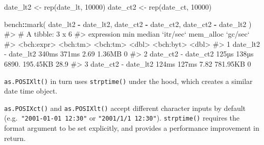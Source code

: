 \documentclass[
]{krantz}
\makeatletter
\newenvironment{Shaded}{\begin{snugshade}}{\end{snugshade}}
\newcommand{\CommentTok}[1]{\textcolor[rgb]{0.56,0.35,0.01}{\textit{#1}}}
\newcommand{\DataTypeTok}[1]{\textcolor[rgb]{0.13,0.29,0.53}{#1}}
\newcommand{\DecValTok}[1]{\textcolor[rgb]{0.00,0.00,0.81}{#1}}
\newcommand{\KeywordTok}[1]{\textcolor[rgb]{0.13,0.29,0.53}{\textbf{#1}}}
\newcommand{\NormalTok}[1]{#1}
\newcommand{\OperatorTok}[1]{\textcolor[rgb]{0.81,0.36,0.00}{\textbf{#1}}}
\newcommand{\StringTok}[1]{\textcolor[rgb]{0.31,0.60,0.02}{#1}}
\newenvironment{kframe}{%
\medskip{}
\setlength{\fboxsep}{.8em}
 \def\at@end@of@kframe{}%
 \ifinner\ifhmode%
  \def\at@end@of@kframe{\end{minipage}}%
  \begin{minipage}{\columnwidth}%
 \fi\fi%
 \def\FrameCommand##1{\hskip\@totalleftmargin \hskip-\fboxsep
 \colorbox{shadecolor}{##1}\hskip-\fboxsep
     \hskip-\linewidth \hskip-\@totalleftmargin \hskip\columnwidth}%
 \MakeFramed {\advance\hsize-\width
   \@totalleftmargin\z@ \linewidth\hsize
   \@setminipage}}%
 {\par\unskip\endMakeFramed%
 \at@end@of@kframe}
\renewenvironment{Shaded}{\begin{kframe}}{\end{kframe}}
\renewcommand{\KeywordTok} [1]{\textcolor[rgb]{0.00,0.44,0.13}{{#1}}}
\renewcommand{\DataTypeTok}[1]{\textcolor[rgb]{0.56,0.13,0.00}{{#1}}}
\renewcommand{\DecValTok}  [1]{\textcolor[rgb]{0.25,0.63,0.44}{{#1}}}
\renewcommand{\StringTok}  [1]{\textcolor[rgb]{0.25,0.44,0.63}{{#1}}}
\renewcommand{\CommentTok} [1]{\textcolor[rgb]{0.38,0.63,0.69}{{#1}}}
\renewcommand{\NormalTok}  [1]{{#1}}
\makeatother
\begin{document}
\begin{Shaded}
\begin{Highlighting}[]
\NormalTok{date_lt2 <-}\StringTok{ }\KeywordTok{rep}\NormalTok{(date_lt, }\DecValTok{10000}\NormalTok{)}
\NormalTok{date_ct2 <-}\StringTok{ }\KeywordTok{rep}\NormalTok{(date_ct, }\DecValTok{10000}\NormalTok{)}

\NormalTok{bench}\OperatorTok{::}\KeywordTok{mark}\NormalTok{(}
\NormalTok{  date_lt2 }\OperatorTok{-}\StringTok{ }\NormalTok{date_lt2, }
\NormalTok{  date_ct2 }\OperatorTok{-}\StringTok{ }\NormalTok{date_ct2,}
\NormalTok{  date_ct2 }\OperatorTok{-}\StringTok{ }\NormalTok{date_lt2}
\NormalTok{)}
\CommentTok{#> # A tibble: 3 x 6}
\CommentTok{#>   expression               min   median `itr/sec` mem_alloc `gc/sec`}
\CommentTok{#>   <bch:expr>          <bch:tm> <bch:tm>     <dbl> <bch:byt>    <dbl>}
\CommentTok{#> 1 date_lt2 - date_lt2    340ms    371ms      2.69    1.36MB      0  }
\CommentTok{#> 2 date_ct2 - date_ct2    125µs    138µs   6890.    195.45KB     28.9}
\CommentTok{#> 3 date_ct2 - date_lt2    124ms    127ms      7.82  781.95KB      0}
\end{Highlighting}
\end{Shaded}

\texttt{as.POSIXlt()} in turn uses \texttt{strptime()} under the hood, which creates a similar date time object.

\begin{Shaded}
\end{Shaded}

\texttt{as.POSIXct()} and \texttt{as.POSIXlt()} accept different character inputs by default (e.g.~\texttt{"2001-01-01\ 12:30"} or \texttt{"2001/1/1\ 12:30"}). \texttt{strptime()} requires the format argument to be set explicitly, and provides a performance improvement in return.
\end{document}
